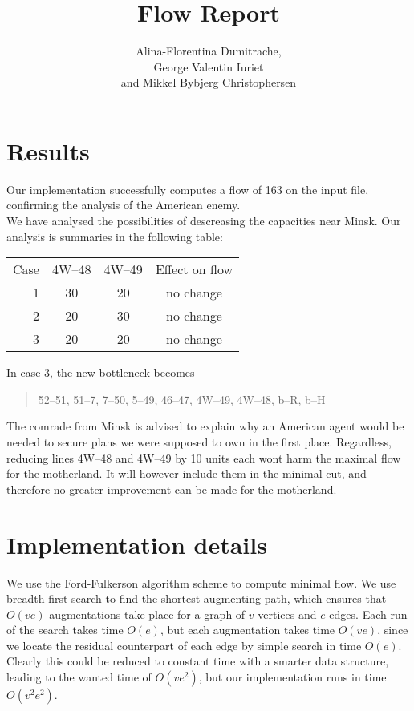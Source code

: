 \documentclass{article}
\title{Flow Report}
\author{Alina-Florentina Dumitrache, \\George Valentin Iuriet \\and Mikkel Bybjerg Christophersen}
\begin{document}
  \maketitle

  \section{Results}

  Our implementation successfully computes a flow of 163 on the input file, confirming the analysis of the American enemy.\\

  We have analysed the possibilities of descreasing the capacities near Minsk.
  Our analysis is summaries in the following table:\\

\bigskip
  \begin{tabular}{rccc}
    Case & 4W--48 & 4W--49 & Effect on flow \\
    1& 30 & 20 & no change \\
    2& 20 & 30 & no change \\
    3& 20 & 20 & no change \\
  \end{tabular}
  \bigskip

  In case 3, the new bottleneck becomes
  \begin{quote}
      52--51, 51--7, 7--50, 5--49, 46--47, 4W--49, 4W--48, b--R, b--H
  \end{quote}
  The comrade from Minsk is advised to explain why an American agent would be needed to secure plans we were supposed to own in the first place. Regardless, reducing lines 4W--48 and 4W--49 by 10 units each wont harm the maximal flow for the motherland. It will however include them in the minimal cut, and therefore no greater improvement can be made for the motherland.\\

  \section{Implementation details}

  We use the Ford-Fulkerson algorithm scheme to compute minimal flow. We use breadth-first search to find the shortest augmenting path, which ensures that $O(ve)$ augmentations take place for a graph of $v$ vertices and $e$ edges. Each run of the search takes time $O(e)$, but each augmentation takes time $O(ve)$, since we locate the residual counterpart of each edge by simple search in time $O(e)$. Clearly this could be reduced to constant time with a smarter data structure, leading to the wanted time of $O(ve^2)$, but our implementation runs in time $O(v^2e^2)$.
\end{document}
